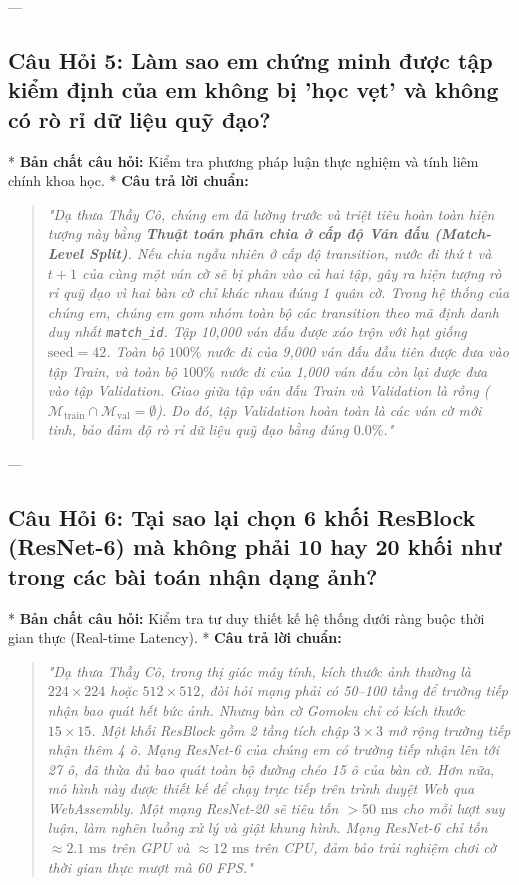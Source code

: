 \documentclass[11pt,a4paper]{report}
\begin{document}
---

\subsection*{Câu Hỏi 5: Làm sao em chứng minh được tập kiểm định của em không bị 'học vẹt' và không có rò rỉ dữ liệu quỹ đạo?}
* \textbf{Bản chất câu hỏi:} Kiểm tra phương pháp luận thực nghiệm và tính liêm chính khoa học.
* \textbf{Câu trả lời chuẩn:}
  \begin{quote}
  \textit{"Dạ thưa Thầy Cô, chúng em đã lường trước và triệt tiêu hoàn toàn hiện tượng này bằng \textbf{Thuật toán phân chia ở cấp độ Ván đấu (Match-Level Split)}.
  Nếu chia ngẫu nhiên ở cấp độ transition, nước đi thứ $t$ và $t+1$ của cùng một ván cờ sẽ bị phân vào cả hai tập, gây ra hiện tượng rò rỉ quỹ đạo vì hai bàn cờ chỉ khác nhau đúng 1 quân cờ.
  Trong hệ thống của chúng em, chúng em gom nhóm toàn bộ các transition theo mã định danh duy nhất \texttt{match\_id}. Tập 10,000 ván đấu được xáo trộn với hạt giống $\text{seed}=42$. Toàn bộ $100\%$ nước đi của 9,000 ván đấu đầu tiên được đưa vào tập Train, và toàn bộ $100\%$ nước đi của 1,000 ván đấu còn lại được đưa vào tập Validation. 
  Giao giữa tập ván đấu Train và Validation là rỗng ($\mathcal{M}_{\text{train}} \cap \mathcal{M}_{\text{val}} = \emptyset$). Do đó, tập Validation hoàn toàn là các ván cờ mới tinh, bảo đảm độ rò rỉ dữ liệu quỹ đạo bằng đúng $0.0\%$."}
  \end{quote}

---

\subsection*{Câu Hỏi 6: Tại sao lại chọn 6 khối ResBlock (ResNet-6) mà không phải 10 hay 20 khối như trong các bài toán nhận dạng ảnh?}
* \textbf{Bản chất câu hỏi:} Kiểm tra tư duy thiết kế hệ thống dưới ràng buộc thời gian thực (Real-time Latency).
* \textbf{Câu trả lời chuẩn:}
  \begin{quote}
  \textit{"Dạ thưa Thầy Cô, trong thị giác máy tính, kích thước ảnh thường là $224 \times 224$ hoặc $512 \times 512$, đòi hỏi mạng phải có 50--100 tầng để trường tiếp nhận bao quát hết bức ảnh. Nhưng bàn cờ Gomoku chỉ có kích thước $15 \times 15$. 
  Một khối ResBlock gồm 2 tầng tích chập $3 \times 3$ mở rộng trường tiếp nhận thêm 4 ô. Mạng ResNet-6 của chúng em có trường tiếp nhận lên tới 27 ô, đã thừa đủ bao quát toàn bộ đường chéo 15 ô của bàn cờ.
  Hơn nữa, mô hình này được thiết kế để chạy trực tiếp trên trình duyệt Web qua WebAssembly. Một mạng ResNet-20 sẽ tiêu tốn $> 50\text{ ms}$ cho mỗi lượt suy luận, làm nghẽn luồng xử lý và giật khung hình. Mạng ResNet-6 chỉ tốn $\approx 2.1\text{ ms}$ trên GPU và $\approx 12\text{ ms}$ trên CPU, đảm bảo trải nghiệm chơi cờ thời gian thực mượt mà 60 FPS."}
  \end{quote}
\end{document}
